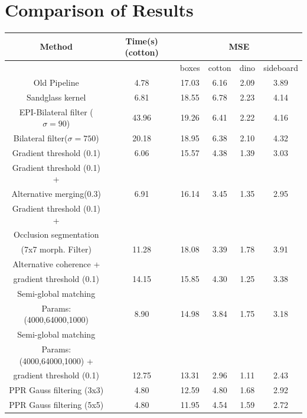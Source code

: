 \documentclass  [
  paper    = a4,
  BCOR     = 10mm,
  twoside,
  fontsize = 12pt,
  fleqn,
  toc      = bibnumbered,
  toc      = listofnumbered,
  numbers  = noendperiod,
  headings = normal,
  listof   = leveldown,
  version  = 3.03
]                                       {scrreprt}
\begin{document}
\section{Comparison of Results}
\begin{table}[h!]
	\centering
	\begin{tabular}{|c|c|c|c|c|c|}
		\hline 
		Method & Time(s) (cotton) & \multicolumn{4}{c|}{MSE} \\ 
		\hline 
		&  & boxes & cotton & dino & sideboard \\ 
		\hline
		Old Pipeline & 4.78 & 17.03 & 6.16 & 2.09 & 3.89 \\
		\hline 
		Sandglass kernel & 6.81  & 18.55  & 6.78  & 2.23  & 4.14 \\ 
		\hline 
		EPI-Bilateral filter ($\sigma = 90$) &  43.96 &  19.26  & 6.41  & 2.22  & 4.16  \\ 
		\hline 
		Bilateral filter($\sigma = 750$) & 20.18  & 18.95  &  6.38 & 2.10  &4.32  \\ 
		\hline 
		Gradient threshold (0.1) & 6.06 & 15.57  & 4.38  & 1.39  & 3.03  \\ 
		\hline 
		Gradient threshold (0.1) +&&&&&\\
		 Alternative merging(0.3) & 6.91 & 16.14 & 3.45 & 1.35 & 2.95 \\
		\hline
		Gradient threshold (0.1) + &&&&&\\Occlusion segmentation&&&&&\\(7x7 morph. Filter) & 11.28  & 18.08 &  3.39 & 1.78  & 3.91  \\ 
		\hline 
		Alternative coherence +&&&&&\\gradient threshold (0.1) & 14.15  & 15.85  & 4.30  & 1.25  & 3.38  \\ 
		\hline 
		Semi-global matching&&&&&\\
		Params: (4000,64000,1000) & 8.90 & 14.98  & 3.84  & 1.75  & 3.18  \\ 
		\hline 
		Semi-global matching&&&&&\\
		Params: (4000,64000,1000) +&&&&&\\
		gradient threshold (0.1) & 12.75  & 13.31  & 2.96   & 1.11   & 2.43 \\ 
		\hline 
		\hline
		PPR Gauss filtering (3x3) & 4.80 & 12.59 & 4.80 & 1.68 & 2.92 \\
		\hline
		PPR Gauss filtering (5x5) &4.80 & 11.95 & 4.54 & 1.59 &  2.72 \\

\end{tabular}
\end{table}
\end{document}
